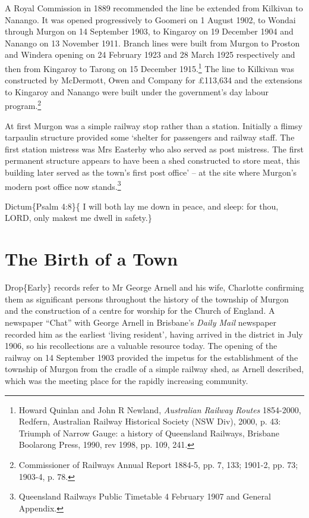 A Royal Commission in 1889 recommended the line be extended from Kilkivan to Nanango. It was opened progressively to Goomeri on 1 August 1902, to Wondai through Murgon on 14 September 1903, to Kingaroy on 19 December 1904 and Nanango on 13 November 1911. Branch lines were built from Murgon to Proston and Windera opening on 24 February 1923 and 28 March 1925 respectively and then from Kingaroy to Tarong on 15 December 1915.\footnote{Howard Quinlan and John R Newland, \emph{Australian Railway Routes} 1854-2000, Redfern, Australian Railway Historical Society (NSW Div), 2000, p. 43: Triumph of Narrow Gauge: a history of Queensland Railways, Brisbane Boolarong Press, 1990, rev 1998, pp. 109, 241.} The line to Kilkivan was constructed by McDermott, Owen and Company for £113,634 and the extensions to Kingaroy and Nanango were built under the government's day labour program.\footnote{Commissioner of Railways Annual Report 1884-5, pp. 7, 133; 1901-2, pp. 73; 1903-4, p. 78.}

At first Murgon was a simple railway stop rather than a station. Initially a flimsy tarpaulin structure provided some `shelter for passengers and railway staff. The first station mistress was Mrs Easterby who also served as post mistress. The first permanent structure appears to have been a shed constructed to store meat, this building later served as the town's first post office' -- at the site where Murgon's modern post office now stands.\footnote{Queensland Railways Public Timetable 4 February 1907 and General Appendix.}

Dictum\{Psalm 4:8\}\{ I will both lay me down in peace, and sleep: for thou, LORD, only makest me dwell in safety.\}

\hypertarget{the-birth-of-a-town}{%
\chapter{The Birth of a Town}\label{the-birth-of-a-town}}

Drop\{Early\} records refer to Mr George Arnell and his wife, Charlotte confirming them as significant persons throughout the history of the township of Murgon and the construction of a centre for worship for the Church of England. A newspaper ``Chat'' with George Arnell in Brisbane's \emph{Daily Mail} newspaper recorded him as the earliest `living resident'\emph{,} having arrived in the district in July 1906, so his recollections are a valuable resource today. The opening of the railway on 14 September 1903 provided the impetus for the establishment of the township of Murgon from the cradle of a simple railway shed, as Arnell described, which was the meeting place for the rapidly increasing community.

